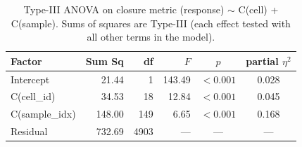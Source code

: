 \begin{table}[!htbp]
\centering
\caption{Type-III ANOVA on closure metric (response) $\sim$ C(cell) + C(sample). Sums of squares are Type-III (each effect tested with all other terms in the model).}
\label{tab:anova}
\begin{tabular}{@{}lrrrcc@{}}
\toprule
Factor & Sum Sq & df & $F$ & $p$ & partial $\eta^2$ \\
\midrule
Intercept & 21.44 & 1 & 143.49 & $<0.001$ & 0.028 \\
C(cell\_id) & 34.53 & 18 & 12.84 & $<0.001$ & 0.045 \\
C(sample\_idx) & 148.00 & 149 & 6.65 & $<0.001$ & 0.168 \\
Residual & 732.69 & 4903 & --- & --- & --- \\
\bottomrule
\end{tabular}
\end{table}